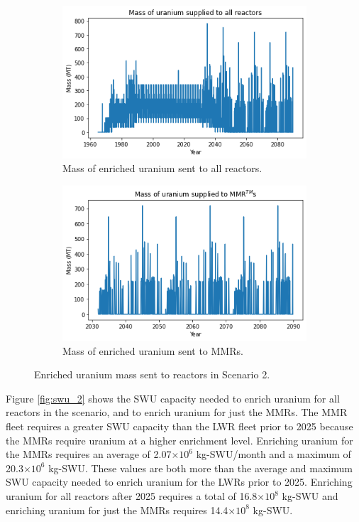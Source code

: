 \begin{figure}
    \centering
    \begin{subfigure}{0.45\textwidth}
        \centering
        \includegraphics[scale=0.4]{../figures/fuelsupply_scenarios_2.png}
        \caption{Mass of enriched uranium sent to all reactors.}
        \label{fig:totalfuel_2}
    \end{subfigure}
    \hspace{0.8cm}
    \begin{subfigure}{0.45\textwidth}
        \centering
        \includegraphics[scale=0.4]{../figures/advancedRX_fuelsupply_scenarios_2.png}
        \caption{Mass of enriched uranium sent to \glspl{MMR}.}
        \label{fig:haleu_2}
    \end{subfigure}
    \caption{Enriched uranium mass sent to reactors in Scenario 2.}
    \label{fig:fuel_2}
\end{figure}

Figure \ref{fig:swu_2} shows the \gls{SWU} capacity needed to 
enrich uranium for all reactors in the scenario, and to enrich uranium for 
just the \glspl{MMR}. The \gls{MMR} fleet requires a greater \gls{SWU} 
capacity than the \gls{LWR} fleet 
prior to 2025 because the \glspl{MMR} require uranium at a higher enrichment 
level. Enriching uranium for the \glspl{MMR} requires an average of 
2.07$\times 10^6$ kg-\gls{SWU}/month and a maximum of 20.3$\times 10^6$ 
kg-\gls{SWU}. These values are both more than the 
average and maximum \gls{SWU} capacity needed to enrich uranium for the 
\glspl{LWR} prior to 2025. Enriching uranium for all reactors after 2025 
requires a total of 16.8$\times 10^8$ kg-SWU and enriching uranium for 
just the \glspl{MMR} requires 14.4$\times 10^8$ kg-SWU. 

